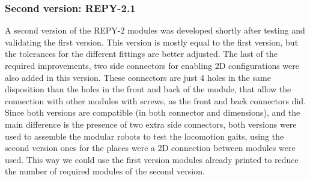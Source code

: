 \subsubsection{Second version: REPY-2.1}

A second version of the REPY-2 modules was developed shortly after testing and validating the first version. This version is mostly equal to the first version, but the tolerances for the different fittings are better adjusted. The last of the required improvements, two side connectors for enabling 2D configurations were also added in this version. These connectors are just 4 holes in the same disposition than the holes in the front and back of the module, that allow the connection with other modules with screws, as the front and back connectors did.\\

Since both versions are compatible (in both connector and dimensions), and the main difference is the presence of two extra side connectors, both versions were used to assemble the modular robots to test the locomotion gaits, using the second version ones for the places were a 2D connection between modules were used. This way we could use the first version modules already printed to reduce the number of required modules of the second version.\\


